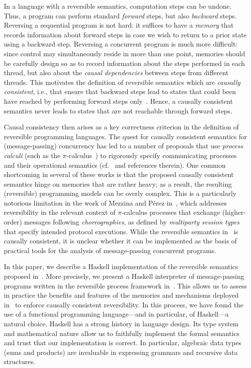 \documentclass[runningheads,plain]{llncs}
\begin{document}
In a language with a reversible semantics, computation steps can be undone.
Thus, a program can perform standard \emph{forward} steps, but also \emph{backward} steps.
Reversing a sequential program is not hard: it suffices to have a \emph{memory} that records information about forward steps in case we wish to return to a prior state using a backward step. Reversing a concurrent program is much more difficult: since control may simultaneously reside in more than one point, memories should be carefully design so as to record information about the steps performed in each thread, but also about the \emph{causal dependencies} between steps from different threads.
This motivates the definition of reversible semantics which are \emph{causally consistent}, i.e., that ensure that backward steps lead to states that could been have reached by performing forward steps only~\cite{DBLP:journals/eatcs/Lanese14}. Hence, a causally consistent  semantics never leads to states that are not reachable through forward steps. 

Causal consistency then arises as a key correctness criterion in the definition of reversible programming languages. The quest for causally consistent semantics for (message-passing) concurrency has led to a number of proposals that use  \emph{process calculi} (such as the $\pi$-calculus~\cite{}) to rigorously specify communicating processes and their operational semantics (cf.~\cite{DBLP:conf/ppdp/MezzinaP17} and references therein). One common shortcoming in several of these works is that the proposed causally consistent semantics hinge on memories that are rather heavy; as a result, the resulting (reversible) programming models can be  overly complex. This is a particularly notorious limitation in the work of Mezzina and P\'{e}rez in~\cite{DBLP:conf/ppdp/MezzinaP17}, which addresses reversibility in the relevant context of $\pi$-calculus processes that exchange (higher-order) messages following \emph{choreographies}, as defined by \emph{multiparty session types}~\cite{HYC08} that specify intended protocol executions. While the reversible semantics in~\cite{DBLP:conf/ppdp/MezzinaP17} is causally consistent, it is unclear whether it can be implemented as the basis of practical tools for the  analysis of message-passing concurrent programs.

In this paper, we describe a Haskell implementation of the reversible semantics proposed in~\cite{DBLP:conf/ppdp/MezzinaP17}. More precisely, we present a Haskell interpreter of message-passing programs written in the reversible process framework in~\cite{DBLP:conf/ppdp/MezzinaP17}. This allows us to assess in practice the benefits and features of the memories and mechanisms deployed in~\cite{DBLP:conf/ppdp/MezzinaP17} to enforce causally consistent reversibility. In this process, we have found the use of a functional programming language---and in particular, of Haskell---a natural choice. Haskell has a strong history in language design. Its type system and mathematical nature allow us to faithfully implement the formal semantics and trust that our implementation is correct. In particular, algebraic data types (sums and products) are invaluable in expressing grammars and recursive data structures. 
\end{document}
